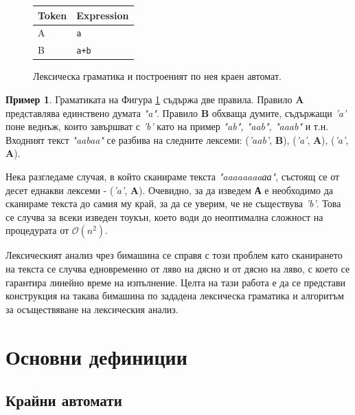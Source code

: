 \documentclass[12pt, oneside]{article}
\theoremstyle{definition}
\newtheorem{example}{Пример}[section]
\begin{document}
\begin{figure}[!htb]
	\begin{center}
		\begin{tabular}{ |l|l| } 
		\hline
		Token & Expression \\
		\hline
		A & \verb/а/ \\
		B & \verb/a+b/ \\
		\hline
		\end{tabular}
	\end{center}
	\centering
	\begingroup
		
	\endgroup
	\label{fig:Lexgr2}
	\caption{Лексическа граматика и построеният по нея краен автомат.}
\end{figure}

\begin{example}
	Граматиката на Фигура \ref{fig:Lexgr2} съдържа две правила. Правило \textbf{A} представлява единствено думата \emph{"a"}. Правило \textbf{B} обхваща думите, съдържащи \emph{'a'} поне веднъж, които завършват с \emph{'b'} като на пример \emph{"ab", "aab", "aaab"} и т.н. Входният текст \emph{"aabaa"} се разбива на следните лексеми: (\emph{'aab'}, \textbf{B}), (\emph{'a'}, \textbf{A}), (\emph{'a'}, \textbf{A}).

	Нека разгледаме случая, в който сканираме текста \emph{"aaaaaaaaаа"}, състоящ се от десет еднакви лексеми - (\emph{'a'}, \textbf{A}). Очевидно, за да изведем \textbf{А} е необходимо да сканираме текста до самия му край, за да се уверим, че не съществува \emph{'b'}. Това се случва за всеки изведен тоукън, което води до неоптимална сложност на процедурата от \( \mathcal{O}(n^2) \).
\end{example}

Лексическият анализ чрез бимашина се справя с този проблем като сканирането на текста се случва едновременно от ляво на дясно и от дясно на ляво, с което се гарантира линейно време на изпълнение. Целта на тази работа е да се представи конструкция на такава бимашина по зададена лексическа граматика и алгоритъм за осъществяване на лексическия анализ.

\pagebreak
\section{Основни дефиниции}

\subsection{Крайни автомати}
\end{document}
